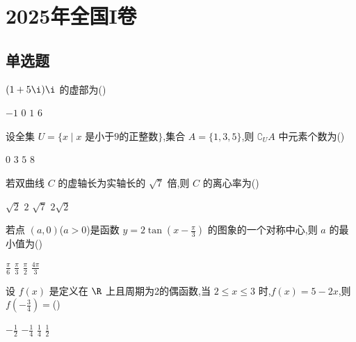 \chapter{2025年全国I卷}

\section{单选题}

\begin{problem}
\((1+5\i)\i\) 的虚部为(\quad)

\choices
    {\(-1\)}
    {\(0\)}
    {\(1\)}
    {\(6\)}
\end{problem}

\begin{problem}
设全集 \(U=\{x \mid x \text{ 是小于9的正整数}\}\),集合 \(A=\{1,3,5\}\),则 \(\complement_U A\) 中元素个数为(\quad)

\choices
    {\(0\)}
    {\(3\)}
    {\(5\)}
    {\(8\)}
\end{problem}

\begin{problem}
若双曲线 \(C\) 的虚轴长为实轴长的 \(\sqrt{7}\) 倍,则 \(C\) 的离心率为(\quad)

\choices
    {\(\sqrt{2}\)}
    {\(2\)}
    {\(\sqrt{7}\)}
    {\(2\sqrt{2}\)}
\end{problem}

\begin{problem}
若点 \((a,0)\)(\(a>0\))是函数 \(y=2\tan\left(x-\frac{\pi}{3}\right)\) 的图象的一个对称中心,则 \(a\) 的最小值为(\quad)

\choices
    {\(\frac{\pi}{6}\)}
    {\(\frac{\pi}{3}\)}
    {\(\frac{\pi}{2}\)}
    {\(\frac{4\pi}{3}\)}
\end{problem}

\begin{problem}
设 \(f(x)\) 是定义在 \(\R\) 上且周期为2的偶函数,当 \(2 \le x \le 3\) 时,\(f(x)=5-2x\),则 \(f\left(-\frac{3}{4}\right)=\)(\quad)

\choices
    {\(-\frac{1}{2}\)}
    {\(-\frac{1}{4}\)}
    {\(\frac{1}{4}\)}
    {\(\frac{1}{2}\)}
\end{problem}

